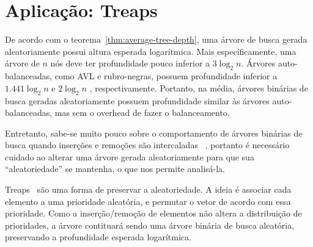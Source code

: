 \section{Aplicação: Treaps}

De acordo com o teorema~\ref{thm:average-tree-depth},
uma árvore de busca gerada aleatoriamente
possui altura esperada logarítmica.
Mais específicamente,
uma árvore de $n$ nós
deve ter profundidade pouco inferior a $3 \log_2 n$.
Árvores auto-balanceadas,
como AVL e rubro-negras,
possuem profundidade inferior a $1.441 \log_2 n$ \cite[p.~460]{Knuth1998}
e $2 \log_2 n$ \cite[p.~309]{CormenLeisersonRivestStein2009},
respectivamente.
Portanto,
na média,
árvores binárias de busca geradas aleatoriamente
possuem profundidade similar às árvores auto-balanceadas,
mas sem o overhead de fazer o balanceamento.

Entretanto,
sabe-se muito pouco sobre o comportamento de árvores binárias de busca
quando inserções e remoções são intercaladas%
~\cite[p.~300]{CormenLeisersonRivestStein2009},
portanto é necessário cuidado ao alterar uma árvore gerada aleatoriamente
para que sua ``aleatoriedade'' se mantenha,
o que nos permite analisá-la.

Treaps~\cite{AragonSeidel1989} são uma forma de preservar a aleatoriedade.
A ideia é associar cada elemento a uma prioridade aleatória,
e permutar o vetor de acordo com essa prioridade.
Como a inserção/remoção de elementos
não altera a distribuição de prioridades,
a árvore contituará sendo uma árvore binária de busca aleatória,
preservando a profundidade esperada logarítmica.
